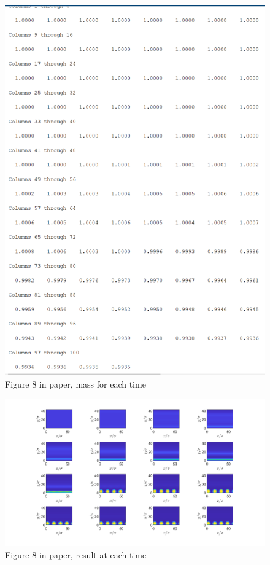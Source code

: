 \documentclass[11pt, a4paper]{article}
\theoremstyle{definition}
\begin{document}
	\begin{figure}[h]
		\centering
		\includegraphics[scale=0.6]{rhobar0072.png}
		\caption{Figure 8 in paper, mass for each time} 
		\label{F1}
	\end{figure}
	\begin{figure}[h]
		\centering
		\includegraphics[scale=0.25]{Plotrhobar0072.png}
		\caption{Figure 8 in paper, result at each time} 
		\label{F2}
	\end{figure}
\end{document}
